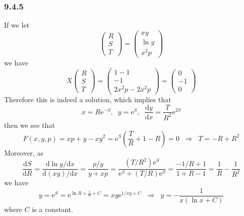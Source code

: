 \documentclass[]{ctexart}
\begin{document}
\subsubsection*{9.4.5}
If we let 
\begin{equation*}
\begin{pmatrix}
R\\S\\T
\end{pmatrix}=\begin{pmatrix}
xy\\\ln y\\x^2p
\end{pmatrix}
\end{equation*}
we have 
\begin{equation*}
X\begin{pmatrix}
R\\S\\T
\end{pmatrix}=\begin{pmatrix}
1-1\\-1\\2x^2p-2x^2p
\end{pmatrix}=\begin{pmatrix}
0\\-1\\0
\end{pmatrix}
\end{equation*}
Therefore this is indeed a solution, which implies that 
\begin{equation*}
x=R\mathrm{e}^{-S},\;\;y=\mathrm{e}^S,\;\;\frac{\mathrm{d}y}{\mathrm{d}x}=\frac{T}{R^2}\mathrm{e}^{2S}
\end{equation*}
then we see that 
\begin{equation*}
F(x,y,p)=xp+y-xy^2=\mathrm{e}^{S}\left(\frac{T}{R}+1-R\right)=0\;\;\Rightarrow\;\;T=-R+R^2
\end{equation*}
Moreover, as 
\begin{equation*}
\frac{\mathrm{d}S}{\mathrm{d}R}=\frac{\mathrm{d}\ln y/\mathrm{d}x}{\mathrm{d}(xy)/\mathrm{d}x}=\frac{p/y}{y+xp}=\frac{(T/R^2)\mathrm{e}^S}{\mathrm{e}^S+(T/R)\mathrm{e}^S}=\frac{-1/R+1}{1+R-1}=\frac{1}{R}-\frac{1}{R^2}
\end{equation*}
we have 
\begin{equation*}
y=\mathrm{e}^S=\mathrm{e}^{\ln R+\frac{1}{R}+C}=xy\mathrm{e}^{1/xy+C}\;\;\Rightarrow\;\;y=-\frac{1}{x(\ln x+C)}
\end{equation*}
where $C$ is a constant. 
\end{document}
